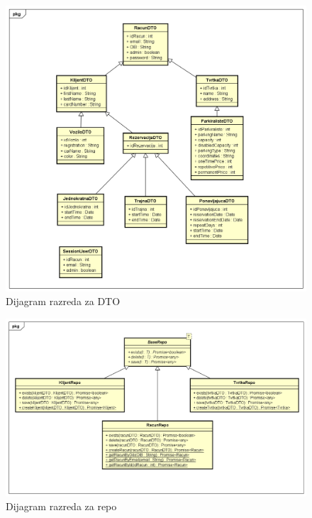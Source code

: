     	\begin{figure}[H]
	    	\includegraphics[width=1\linewidth]{dijagrami/Dijagram razreda - DTO.png}
	    	\caption{Dijagram razreda za DTO}
	    	\label{fig:Dijagram razreda - DTO} 
	   	 \end{figure}
    
		\begin{figure}[H]
			\includegraphics[width=1\linewidth]{dijagrami/Dijagram razreda - Repo.png}
			\caption{Dijagram razreda za repo}
			\label{fig:Dijagram razreda - Repo} 
		\end{figure}
	
